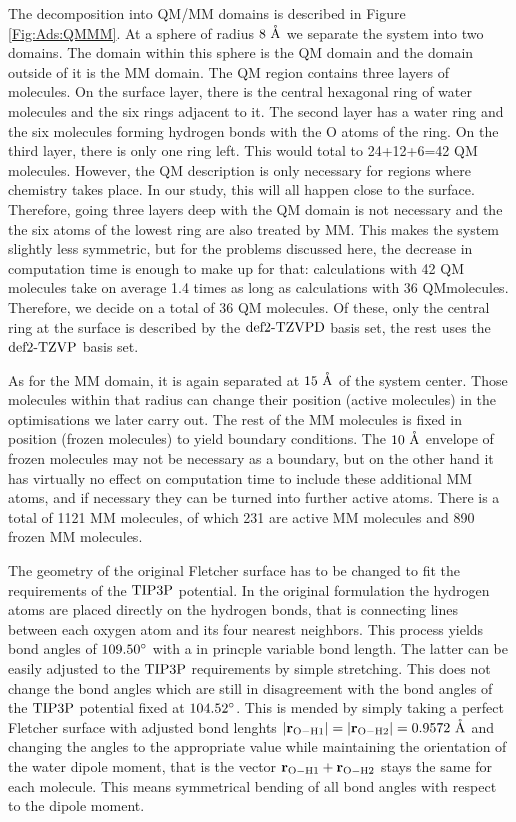 \documentclass[8.5pt,twoside,twocolumn]{article}
\renewcommand{\Ang}{\mathring{\te{A}}}
\renewcommand\r{\bo r}
\theoremstyle{standard}
\begin{document}
The decomposition into QM/MM domains is described in Figure \ref{Fig:Ads:QMMM}.
At a sphere of radius $8~\Ang$ we separate the system into two domains. The
domain within this sphere is the QM domain and the domain outside of it
is the MM domain. 
The QM region contains three layers of molecules. On the surface layer,
there is the central hexagonal ring of water molecules and the six
rings adjacent to it. The second layer has a water ring and the six
molecules forming hydrogen bonds with the O atoms of the ring. On 
the third layer, there is only one ring left. This would total
to 24+12+6=42 QM molecules. However, the QM description is only
necessary for regions where chemistry takes place. In our study,
this will all happen close to the surface. Therefore, going three
layers deep with the QM domain is not necessary and the the six
atoms of the lowest ring are also treated by MM. This makes the system slightly
less symmetric, but for the problems discussed here, the decrease in
computation time is enough to make up for that: calculations with 42 QM molecules
take on average 1.4 times as long as calculations with 36 QMmolecules.
Therefore, we decide on a total of 36 QM molecules. 
Of these, only the central ring at
the surface is described by the $\text{def2-TZVPD}$ basis set, the rest
uses the $\text{def2-TZVP}$ basis set. 

As for the MM domain, it is again separated at $15~\Ang$ of the system center.
Those molecules within that radius can change their position (active molecules) in the optimisations we
later carry out. The rest of the MM molecules is fixed in position (frozen molecules) to yield
boundary conditions. The $10~\Ang$ envelope of frozen molecules may not be necessary as a boundary,
but on the other hand it has virtually no effect on computation time to include
these additional MM atoms, and if necessary they can be turned into
further active atoms. There is a total of 1121 MM molecules, of
which 231 are active MM molecules and 890 frozen MM molecules.

The geometry of the original Fletcher surface has to be changed to fit the requirements
of the $\text{TIP3P}$ potential. In the original formulation the hydrogen atoms
are placed directly on the hydrogen bonds, that is connecting lines between each oxygen atom
and its four nearest neighbors. This process yields bond angles of $109.50 \degree$
with a in princple variable bond length. The latter can be easily adjusted
to the $\text{TIP3P}$ requirements by simple stretching. This does not change the bond angles which
are still in disagreement with the bond angles of the $\text{TIP3P}$ potential
fixed at $104.52 \degree$. This is mended by simply taking a perfect
Fletcher surface with adjusted bond lenghts $\abs{\r_{\te O - \te H1}}=\abs{\r_{\te O - \te H2}}=0.9572~\Ang$
and changing the angles to the appropriate value while maintaining
the orientation of the water dipole moment, that is the vector $\r_{\te O - \te H1}+\r_{\te O - \te H2}$
stays the same for each molecule. This means symmetrical bending of all bond angles with
respect to the dipole moment.
\end{document}
